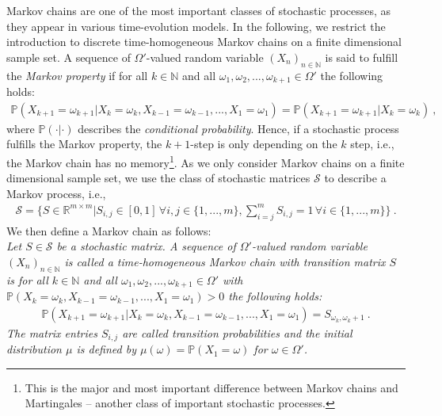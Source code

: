 \documentclass[11pt,a4paper]{article}
\numberwithin{equation}{section}
\begin{document}
%
Markov chains are one of the most important classes of stochastic processes, as they appear in various time-evolution models.
%
In the following, we restrict the introduction to discrete time-homogeneous Markov chains on a finite dimensional sample set. 
%
A sequence of $\Omega'$-valued random variable $(X_n)_{n\in\mathbb{N}}$ is said to fulfill the {\it Markov property} if for all $k\in\mathbb{N}$ and all $\omega_1,\omega_2,...,\omega_{k+1}\in \Omega'$ the following holds:
\begin{align*}
\mathbb{P}(X_{k+1}=\omega_{k+1}|X_{k}=\omega_{k},X_{k-1}=\omega_{k-1},...,X_{1}=\omega_{1})
=
\mathbb{P}(X_{k+1}=\omega_{k+1}|X_{k}=\omega_{k})~,
\end{align*}
where $\mathbb{P}(\cdot|\cdot)$ describes the {\it conditional probability}.
%
Hence, if a stochastic process fulfills the Markov property, the $k+1$-step is only depending on the $k$ step, i.e., the Markov chain has no memory\footnote{This is the major and most important difference between Markov chains and Martingales -- another class of important stochastic processes.}.
%
As we only consider Markov chains on a finite dimensional sample set, we use the class of stochastic matrices $\mathcal{S}$ to describe a Markov process, i.e., 
\begin{align*}
\mathcal{S} = \bigg\lbrace S\in \mathbb{R}^{m\times m} | S_{i,j}\in[0,1]\,\forall i,j\in\{1,...,m\}, \sum_{i=j}^mS_{i,j}=1\,\forall i\in\{1,...,m\} \bigg\rbrace~.
\end{align*}
We then define a Markov chain as follows:\\

\textit{
Let $S\in\mathcal{S}$ be a stochastic matrix. 
%
A sequence of $\Omega'$-valued random variable $(X_n)_{n\in\mathbb{N}}$ is called a time-homogeneous Markov chain with transition matrix $S$ is for all $k\in\mathbb{N}$ and all $\omega_1,\omega_2,...,\omega_{k+1}\in \Omega'$ with $\mathbb{P}(X_{k}=\omega_{k},X_{k-1}=\omega_{k-1},...,X_{1}=\omega_{1})>0$ the following holds:
\begin{align*}
\mathbb{P}(X_{k+1}=\omega_{k+1}|X_{k}=\omega_{k},X_{k-1}=\omega_{k-1},...,X_{1}=\omega_{1})
=S_{\omega_k,\omega_k+1}~.
\end{align*}
The matrix entries $S_{i,j}$ are called transition probabilities and the initial distribution $\mu$ is defined by $\mu(\omega)=\mathbb{P}(X_1=\omega)$ for $\omega\in\Omega'$.\\
}
\end{document}
